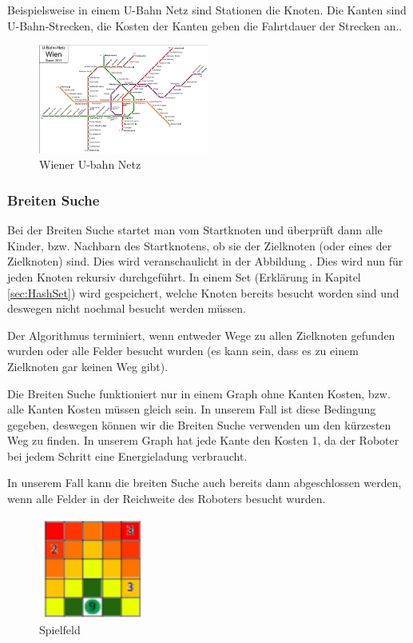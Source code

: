 \documentclass[a4paper,12pt,arial]{scrartcl}
\begin{document}
Beispielsweise in einem U-Bahn Netz sind Stationen die Knoten. Die Kanten sind U-Bahn-Strecken, die Kosten der Kanten geben die Fahrtdauer der Strecken an..
\begin{figure}[h]
    \centering
    \includegraphics[width=0.5\textwidth]{u-bahn.pdf}
    \caption{Wiener U-bahn Netz \textcite{wikipediaUbahn}}
    \label{fig:u-bahn-netz}
\end{figure}



\subsubsection{Breiten Suche}


Bei der Breiten Suche startet man vom Startknoten und überprüft dann alle Kinder, bzw. Nachbarn des Startknotens, ob sie der Zielknoten (oder eines der Zielknoten) sind.
Dies wird veranschaulicht in der Abbildung .
Dies wird nun für jeden Knoten rekursiv durchgeführt.
In einem Set (Erklärung in Kapitel \ref{sec:HashSet}) wird gespeichert, welche Knoten bereits besucht worden sind und deswegen nicht nochmal besucht werden müssen.
\par
Der Algorithmus terminiert, wenn entweder Wege zu allen Zielknoten gefunden wurden oder alle Felder besucht wurden (es kann sein, dass es zu einem Zielknoten gar keinen Weg gibt).

Die Breiten Suche funktioniert nur in einem Graph ohne Kanten Kosten, bzw. alle Kanten Kosten müssen gleich sein. In unserem Fall ist diese Bedingung gegeben, deswegen können wir die Breiten Suche verwenden um den kürzesten Weg zu finden.
In unserem Graph hat jede Kante den Kosten 1, da der Roboter bei jedem Schritt eine Energieladung verbraucht.
\par
In unserem Fall kann die breiten Suche auch bereits dann abgeschlossen werden, wenn alle Felder in der Reichweite des Roboters besucht wurden.

\begin{figure}
    \includegraphics[width=0.3\textwidth]{Stromrallye_Feld_BFS.pdf}
    \caption{Spielfeld}
    \label{fig:bfs_stromrallye}
    \vspace{-20pt}
\end{figure}
\end{document}
